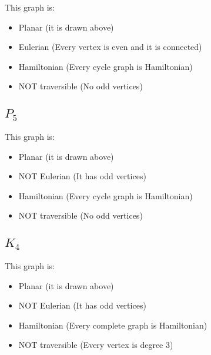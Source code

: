 \documentclass{article}%
\begin{document}
This graph is:
\begin{itemize}
    \item Planar (it is drawn above)
    \item Eulerian (Every vertex is even and it is connected)
    \item Hamiltonian (Every cycle graph is Hamiltonian)
    \item NOT traversible (No odd vertices)
\end{itemize}

\subsection{$P_5$}

This graph is:
\begin{itemize}
    \item Planar (it is drawn above)
    \item NOT Eulerian (It has odd vertices)
    \item Hamiltonian (Every cycle graph is Hamiltonian)
    \item NOT traversible (No odd vertices)
\end{itemize}

\subsection{$K_4$}


This graph is:
\begin{itemize}
    \item Planar (it is drawn above)
    \item NOT Eulerian (It has odd vertices)
    \item Hamiltonian (Every complete graph is Hamiltonian)
    \item NOT traversible (Every vertex is degree 3)
\end{itemize}
\end{document}
